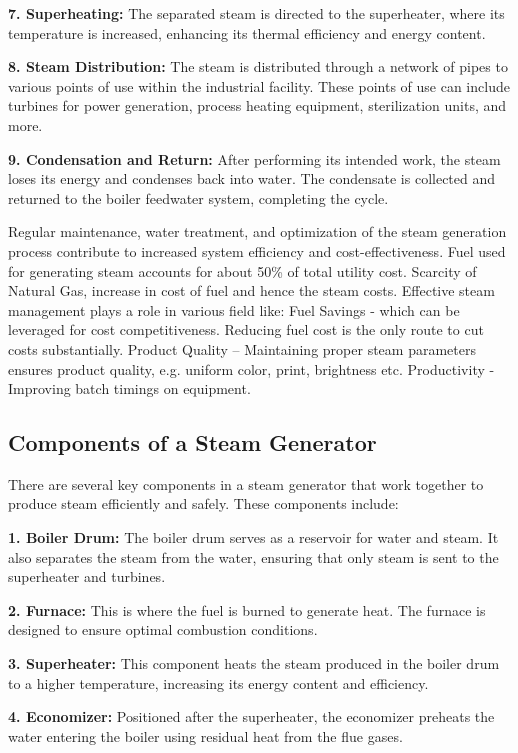 \textbf{7. Superheating:} The separated steam is directed to the
superheater, where its temperature is increased, enhancing its thermal efficiency and energy content.

\textbf{8. Steam Distribution:} The steam is distributed through a network of pipes to various points of use within the industrial facility. These points of use can include turbines for power generation, process heating equipment, sterilization units, and more.

\textbf{9. Condensation and Return:} After performing its intended work, the steam loses its energy and condenses back into water. The condensate is collected and returned to the boiler feedwater system, completing the cycle.

Regular maintenance, water treatment, and optimization of the steam generation process contribute to increased system efficiency and cost-effectiveness.
Fuel used for generating steam accounts for about 50\% of total utility cost. Scarcity of Natural Gas, increase in cost of fuel and hence the steam costs. Effective steam management plays a role in various field like:
Fuel Savings - which can be leveraged for cost competitiveness. Reducing fuel cost is the only route to cut costs substantially.
Product Quality – Maintaining proper steam parameters ensures product quality, e.g. uniform color, print, brightness etc.
Productivity - Improving batch timings on equipment.

\subsection{Components of a Steam Generator}
There are several key components in a steam generator that work together to produce steam efficiently and safely. These components include:

\textbf{1. Boiler Drum:} The boiler drum serves as a reservoir for water and steam. It also separates the steam from the water, ensuring that only steam is sent to the superheater and turbines.

\textbf{2. Furnace:} This is where the fuel is burned to generate heat. The furnace is designed to ensure optimal combustion conditions.

\textbf{3. Superheater:} This component heats the steam produced in the boiler drum to a higher temperature, increasing its energy content and efficiency.

\textbf{4. Economizer:} Positioned after the superheater, the economizer preheats the water entering the boiler using residual heat from the flue gases.

